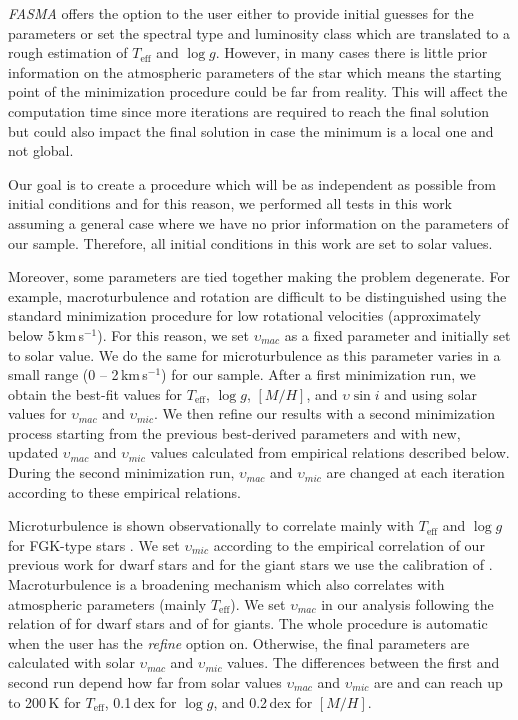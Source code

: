 \documentclass[fleqn,usenatbib]{mnras}
\begin{document}
\textit{FASMA} offers the option to the user either to provide initial guesses for the parameters or set the spectral type and luminosity class which are translated 
to a rough estimation of $T_{\mathrm{eff}}$ and $\log g$. However, in many cases there is little prior information on the atmospheric parameters of the star which means the 
starting point of the minimization procedure could be far from reality. This will affect the computation time since more iterations are required to reach the final solution 
but could also impact the final solution in case the minimum is a local one and not global. 

Our goal is to create a procedure which will be as independent as possible from initial conditions and for this reason, we performed all tests in this work assuming a general 
case where we have no prior information on the parameters of our sample. Therefore, all initial conditions in this work are set to solar values.

Moreover, some parameters are tied together making the problem degenerate. For example, macroturbulence and rotation are difficult to be 
distinguished using the standard minimization procedure for low rotational velocities (approximately below 5\,km\,s$^{-1}$). 
For this reason, we set $\upsilon_{mac}$ as a fixed parameter and initially set to solar value. We do the same for microturbulence as this parameter varies in a small range (0 -- 2\,km\,s$^{-1}$) 
for our sample. After a first minimization run, we obtain the best-fit values for $T_{\mathrm{eff}}$, $\log g$, $[M/H]$, and $\upsilon \sin i$ and using solar values for $\upsilon_{mac}$ 
and $\upsilon_{mic}$. We then refine our results with a second minimization process starting from the previous best-derived parameters and with new, updated $\upsilon_{mac}$ and $\upsilon_{mic}$ 
values calculated from empirical relations described below. During the second minimization run, $\upsilon_{mac}$ and $\upsilon_{mic}$ are changed at each iteration according to these 
empirical relations. 

Microturbulence is shown observationally to correlate mainly with $T_{\mathrm{eff}}$ and $\log g$ for FGK-type stars \citep[e.g.][]{nissen, adib2, ramirez13}. 
We set $\upsilon_{mic}$ according to the empirical correlation of our previous work for dwarf stars \citep{tsantaki13} and for the giant stars we use the calibration of \cite{Adibekyan2015}. 
Macroturbulence is a broadening mechanism which also correlates with atmospheric parameters (mainly $T_{\mathrm{eff}}$). 
We set $\upsilon_{mac}$ in our analysis following the relation of \cite{Doyle2014} for dwarf stars and of \cite{Hekker2007} for giants. 
The whole procedure is automatic when the user has the \textit{refine} option on. Otherwise, the final parameters are calculated with solar $\upsilon_{mac}$ and $\upsilon_{mic}$ values. 
The differences between the first and second run depend how far from solar values $\upsilon_{mac}$ and $\upsilon_{mic}$ are and can reach up to 200\,K for $T_{\mathrm{eff}}$, 0.1\,dex for 
$\log g$, and 0.2\,dex for $[M/H]$. 
\end{document}
